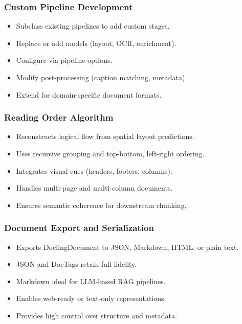 \begin{frame}[fragile]\frametitle{Custom Pipeline Development}
      \begin{itemize}
        \item Subclass existing pipelines to add custom stages.
        \item Replace or add models (layout, OCR, enrichment).
        \item Configure via pipeline options.
        \item Modify post-processing (caption matching, metadata).
        \item Extend for domain-specific document formats.
      \end{itemize}
\end{frame}

\begin{frame}[fragile]\frametitle{Reading Order Algorithm}
      \begin{itemize}
        \item Reconstructs logical flow from spatial layout predictions.
        \item Uses recursive grouping and top-bottom, left-right ordering.
        \item Integrates visual cues (headers, footers, columns).
        \item Handles multi-page and multi-column documents.
        \item Ensures semantic coherence for downstream chunking.
      \end{itemize}
\end{frame}

\begin{frame}[fragile]\frametitle{Document Export and Serialization}
      \begin{itemize}
        \item Exports DoclingDocument to JSON, Markdown, HTML, or plain text.
        \item JSON and DocTags retain full fidelity.
        \item Markdown ideal for LLM-based RAG pipelines.
        \item Enables web-ready or text-only representations.
        \item Provides high control over structure and metadata.
      \end{itemize}
\end{frame}

